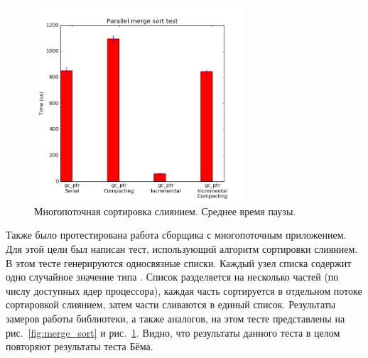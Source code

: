 \begin{figure}[ht!]
\centering
\includegraphics[width=0.7\textwidth]{Moiseenko/images/merge_sort_pause_all.png}
\caption{Многопоточная сортировка слиянием. Среднее время паузы.}
\label{fig:merge_sort_pause}
\end{figure}

Также было протестирована работа сборщика с многопоточным приложением. 
Для этой цели был написан тест, использующий алгоритм сортировки слиянием. 
В этом тесте генерируются односвязные списки. 
Каждый узел списка содержит одно случайное значение типа . 
Список разделяется на несколько частей (по числу доступных ядер процессора), 
каждая часть сортируется в отдельном потоке сортировкой слиянием, 
затем части сливаются в единый список. 
Результаты замеров работы библиотеки, а также аналогов, на этом тесте представлены 
на рис.~\ref{fig:merge_sort} и рис.~\ref{fig:merge_sort_pause}. 
Видно, что результаты данного теста в целом повторяют результаты теста Бёма. 
